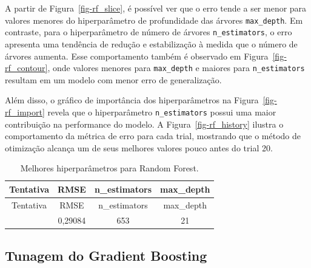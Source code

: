 \documentclass[
  12pt,
  a4paper,
]{scrreprt}
\begin{document}
\vspace{12pt}

A partir de Figura~\ref{fig-rf_slice}, é possível ver que o erro tende a
ser menor para valores menores do hiperparâmetro de profundidade das
árvores \texttt{max\_depth}. Em contraste, para o hiperparâmetro de
número de árvores \texttt{n\_estimators}, o erro apresenta uma tendência
de redução e estabilização à medida que o número de árvores aumenta.
Esse comportamento também é observado em Figura~\ref{fig-rf_contour},
onde valores menores para \texttt{max\_depth} e maiores para
\texttt{n\_estimators} resultam em um modelo com menor erro de
generalização.

\vspace{12pt}

Além disso, o gráfico de importância dos hiperparâmetros na
Figura~\ref{fig-rf_import} revela que o hiperparâmetro
\texttt{n\_estimators} possui uma maior contribuição na performance do
modelo. A Figura~\ref{fig-rf_history} ilustra o comportamento da métrica
de erro para cada trial, mostrando que o método de otimização alcança um
de seus melhores valores pouco antes do trial 20.

\begin{longtable}[]{@{}cccc@{}}
\caption{Melhores hiperparâmetros para Random
Forest.}\label{tbl-params_rf}\tabularnewline
\toprule\noalign{}
Tentativa & RMSE & n\_estimators & max\_depth \\
\midrule\noalign{}
\endfirsthead
\toprule\noalign{}
Tentativa & RMSE & n\_estimators & max\_depth \\
\midrule\noalign{}
\endhead
\bottomrule\noalign{}
\endlastfoot
62 & 0,29084 & 653 & 21 \\
\end{longtable}

\subsection{Tunagem do Gradient
Boosting}\label{tunagem-do-gradient-boosting}
\end{document}
